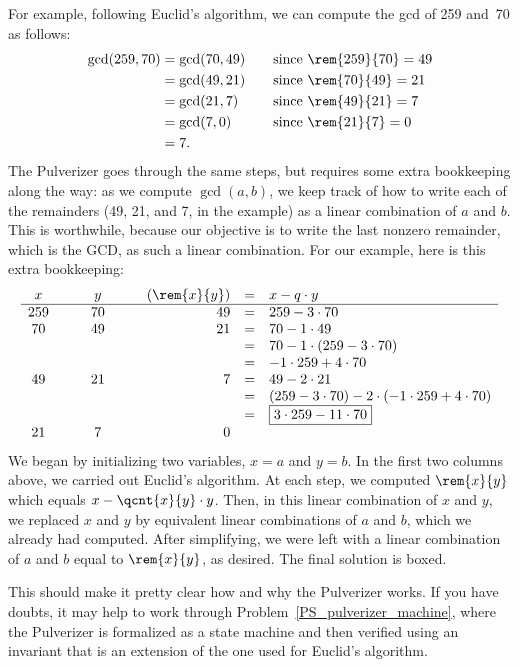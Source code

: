 For example, following Euclid's algorithm, we can compute the gcd of
259 and~70 as follows:
\begin{align*}
\gcd(259, 70) & = \gcd(70, 49) & \quad & \text{since $\rem{259}{70} = 49$}\\
 & = \gcd(49, 21) && \text{since $\rem{70}{49} = 21$} \\
 & = \gcd(21, 7) && \text{since $\rem{49}{21} = 7$} \\
 & = \gcd(7, 0)
                && \text{since $\rem{21}{7} = 0$} \\
 & = 7.
\end{align*}
The Pulverizer goes through the same steps, but requires some extra
bookkeeping along the way: as we compute $\gcd(a, b)$, we keep track
of how to write each of the remainders (49, 21, and 7, in the example)
as a linear combination of $a$ and $b$.  This is worthwhile, because
our objective is to write the last nonzero remainder, which is the
GCD, as such a linear combination.  For our example, here is this
extra bookkeeping:
\[
\begin{array}{ccccrcl}
x & \quad & y & \quad & (\rem{x}{y}) & = & x - q \cdot y \\
\hline
259 && 70 && 49 & = & 259 - 3 \cdot 70 \\
 70 && 49 && 21 & = & 70 - 1 \cdot 49 \\
           &&&& & = & 70 - 1 \cdot (259 - 3 \cdot 70) \\
           &&&& & = & -1 \cdot 259 + 4 \cdot 70 \\
 49 && 21 && 7  & = & 49 - 2 \cdot 21\\
           &&&& & = & (259 - 3 \cdot 70) - 2 \cdot (-1 \cdot 259 + 4 \cdot 70) \\
           &&&& & = & \fbox{$3 \cdot 259 - 11 \cdot 70$} \\
 21 && 7 && 0
\end{array}
\]
We began by initializing two variables, $x = a$ and $y = b$.  In the
first two columns above, we carried out Euclid's algorithm.  At each
step, we computed $\rem{x}{y}$ which equals $x - \qcnt{x}{y} \cdot y$.
Then, in this linear combination of $x$ and $y$, we replaced $x$ and
$y$ by equivalent linear combinations of $a$ and $b$, which we already
had computed.  After simplifying, we were left with a linear
combination of $a$ and $b$ equal to $\rem{x}{y}$, as desired.  The
final solution is boxed.

This should make it pretty clear how and why the Pulverizer works.  If
you have doubts, it may help to work through
Problem~\ref{PS_pulverizer_machine}, where the Pulverizer is
formalized as a state machine and then verified using an invariant
that is an extension of the one used for Euclid's algorithm.

